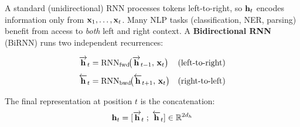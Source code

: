 A standard (unidirectional) RNN processes tokens left-to-right, so $\mathbf{h}_t$
encodes information only from $\mathbf{x}_1, \ldots, \mathbf{x}_t$.  Many NLP tasks
(classification, NER, parsing) benefit from access to \emph{both} left
and right context.  A \textbf{Bidirectional RNN} (BiRNN) runs two
independent recurrences:

\begin{align}
\overrightarrow{\mathbf{h}}_t &= \text{RNN}_{\text{fwd}}\!\bigl(
  \overrightarrow{\mathbf{h}}_{t-1},\, \mathbf{x}_t\bigr)
  & \text{(left-to-right)} \\[4pt]
\overleftarrow{\mathbf{h}}_t &= \text{RNN}_{\text{bwd}}\!\bigl(
  \overleftarrow{\mathbf{h}}_{t+1},\, \mathbf{x}_t\bigr)
  & \text{(right-to-left)}
\end{align}

The final representation at position $t$ is the concatenation:
\begin{equation}
\mathbf{h}_t = [\overrightarrow{\mathbf{h}}_t \;;\; \overleftarrow{\mathbf{h}}_t]
\in \mathbb{R}^{2 d_h}
\end{equation}

